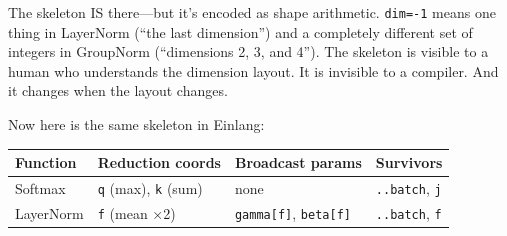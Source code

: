 \documentclass[11pt,titlepage]{article}
\begin{document}
The skeleton IS there---but it's encoded as shape arithmetic.
\texttt{dim=-1} means one thing in LayerNorm (``the last dimension'')
and a completely different set of integers in GroupNorm (``dimensions 2,
3, and 4''). The skeleton is visible to a human who understands the
dimension layout. It is invisible to a compiler. And it changes when the
layout changes.

Now here is the same skeleton in Einlang:

\begin{longtable}[]{@{}llll@{}}
\toprule
\begin{minipage}[b]{0.22\columnwidth}\raggedright
Function\strut
\end{minipage} & \begin{minipage}[b]{0.22\columnwidth}\raggedright
Reduction coords\strut
\end{minipage} & \begin{minipage}[b]{0.22\columnwidth}\raggedright
Broadcast params\strut
\end{minipage} & \begin{minipage}[b]{0.22\columnwidth}\raggedright
Survivors\strut
\end{minipage}\tabularnewline
\midrule
\endhead
\begin{minipage}[t]{0.22\columnwidth}\raggedright
Softmax\strut
\end{minipage} & \begin{minipage}[t]{0.22\columnwidth}\raggedright
\texttt{q} (max), \texttt{k} (sum)\strut
\end{minipage} & \begin{minipage}[t]{0.22\columnwidth}\raggedright
none\strut
\end{minipage} & \begin{minipage}[t]{0.22\columnwidth}\raggedright
\texttt{..batch}, \texttt{j}\strut
\end{minipage}\tabularnewline
\begin{minipage}[t]{0.22\columnwidth}\raggedright
LayerNorm\strut
\end{minipage} & \begin{minipage}[t]{0.22\columnwidth}\raggedright
\texttt{f} (mean ×2)\strut
\end{minipage} & \begin{minipage}[t]{0.22\columnwidth}\raggedright
\texttt{gamma{[}f{]}}, \texttt{beta{[}f{]}}\strut
\end{minipage} & \begin{minipage}[t]{0.22\columnwidth}\raggedright
\texttt{..batch}, \texttt{f}\strut

\end{minipage}
\end{longtable}
\end{document}
